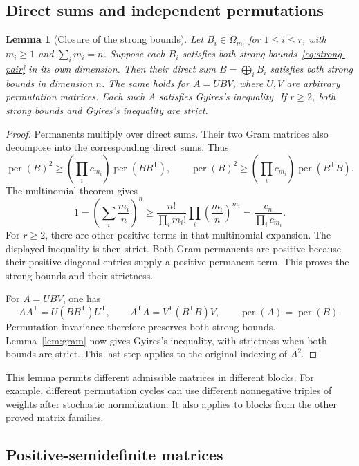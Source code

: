 \documentclass[11pt,a4paper]{article}
\newtheorem{lemma}[theorem]{Lemma}
\theoremstyle{definition}
\theoremstyle{remark}
\newcommand{\per}{\operatorname{per}}
\newcommand{\T}{\mathsf{T}}
\begin{document}
\subsection{Direct sums and independent permutations}

\begin{lemma}[Closure of the strong bounds]\label{lem:struct-direct-sum}
Let $B_i\in\Omega_{m_i}$ for $1\le i\le r$, with $m_i\ge1$ and $\sum_i m_i=n$.
Suppose each $B_i$ satisfies both strong bounds~\eqref{eq:strong-pair} in its own dimension.
Then their direct sum $B=\bigoplus_i B_i$ satisfies both strong bounds in dimension $n$.
The same holds for $A=UBV$, where $U,V$ are arbitrary permutation matrices.
Each such $A$ satisfies Gyires's inequality.
If $r\ge2$, both strong bounds and Gyires's inequality are strict.
\end{lemma}

\begin{proof}
Permanents multiply over direct sums. Their two Gram matrices also decompose into the corresponding direct sums.
Thus
\[
 \per(B)^2\ge\left(\prod_i c_{m_i}\right)\per(BB^\T),
 \qquad
 \per(B)^2\ge\left(\prod_i c_{m_i}\right)\per(B^\T B).
\]
The multinomial theorem gives
\[
 1=\left(\sum_i\frac{m_i}{n}\right)^n
 \ge\frac{n!}{\prod_i m_i!}\prod_i\left(\frac{m_i}{n}\right)^{m_i}
 =\frac{c_n}{\prod_i c_{m_i}}.
\]
For $r\ge2$, there are other positive terms in that multinomial expansion.
The displayed inequality is then strict.
Both Gram permanents are positive because their positive diagonal entries supply a positive permanent term.
This proves the strong bounds and their strictness.

For $A=UBV$, one has
\[
 AA^\T=U(BB^\T)U^\T,
 \qquad A^\T A=V^\T(B^\T B)V,
 \qquad \per(A)=\per(B).
\]
Permutation invariance therefore preserves both strong bounds.
Lemma~\ref{lem:gram} now gives Gyires's inequality, with strictness when both bounds are strict.
This last step applies to the original indexing of $A^2$.
\end{proof}

This lemma permits different admissible matrices in different blocks.
For example, different permutation cycles can use different nonnegative triples of weights after stochastic normalization.
It also applies to blocks from the other proved matrix families.

\subsection{Positive-semidefinite matrices}
\end{document}

